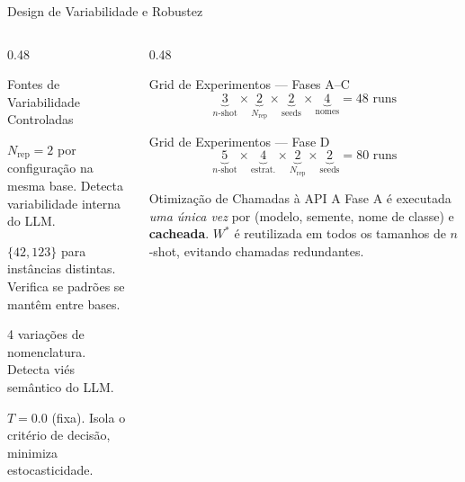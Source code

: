 \documentclass[aspectratio=169, 8pt]{beamer}
\begin{document}
\begin{frame}{Design de Variabilidade e Robustez}
  \begin{columns}[T]
    \begin{column}{0.48\textwidth}
      \begin{block}{Fontes de Variabilidade Controladas}
        \begin{description}
          \footnotesize
          \item[\textbf{Repetições}] $N_{\text{rep}} = 2$ por configuração
            na mesma base. Detecta variabilidade interna do LLM.
          \item[\textbf{Sementes}] $\{42, 123\}$ para instâncias distintas.
            Verifica se padrões se mantêm entre bases.
          \item[\textbf{Nomes}] 4 variações de nomenclatura.
            Detecta viés semântico do LLM.
          \item[\textbf{Temperatura}] $T = 0.0$ (fixa).
            Isola o critério de decisão,
            minimiza estocasticidade.
        \end{description}
      \end{block}
    \end{column}

    \begin{column}{0.48\textwidth}
      \begin{exampleblock}{Grid de Experimentos --- Fases A--C}
        \[
          \underbrace{3}_{n\text{-shot}} \times
          \underbrace{2}_{N_{\text{rep}}} \times
          \underbrace{2}_{\text{seeds}} \times
          \underbrace{4}_{\text{nomes}}
          = 48 \text{ runs}
        \]
      \end{exampleblock}

      \vspace{0.1em}

      \begin{exampleblock}{Grid de Experimentos --- Fase D}
        \[
          \underbrace{5}_{n\text{-shot}} \times
          \underbrace{4}_{\text{estrat.}} \times
          \underbrace{2}_{N_{\text{rep}}} \times
          \underbrace{2}_{\text{seeds}}
          = 80 \text{ runs}
        \]
      \end{exampleblock}

      \vspace{0.1em}

      \begin{alertblock}{Otimização de Chamadas à API}
        A Fase A é executada \emph{uma única vez} por
        (modelo, semente, nome de classe) e \textbf{cacheada}.
        $W^*$ é reutilizada em todos os tamanhos de $n$-shot,
        evitando chamadas redundantes.
      \end{alertblock}
    \end{column}
  \end{columns}
\end{frame}
\end{document}
